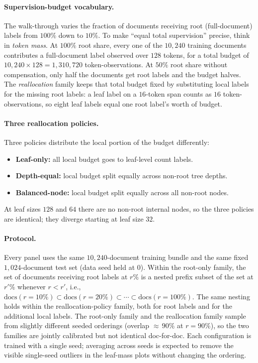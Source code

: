 \paragraph{Supervision-budget vocabulary.}
The walk-through varies the fraction of documents receiving root
(full-document) labels from $100\%$ down to $10\%$. To make
``equal total supervision'' precise, think in \emph{token mass}. At
$100\%$ root share, every one of the $10{,}240$ training documents
contributes a full-document label observed over $128$ tokens, for a
total budget of $10{,}240 \times 128 = 1{,}310{,}720$
token-observations. At $50\%$ root share without compensation, only
half the documents get root labels and the budget halves. The
\emph{reallocation} family keeps that total budget fixed by
substituting local labels for the missing root labels: a leaf label
on a $16$-token span counts as $16$ token-observations, so
eight leaf labels equal one root label's worth of budget.

\paragraph{Three reallocation policies.}
Three policies distribute the local portion of the budget
differently:
\begin{itemize}[leftmargin=1.5em]
    \item \textbf{Leaf-only:} all local budget goes to leaf-level
          count labels.
    \item \textbf{Depth-equal:} local budget split equally across
          non-root tree depths.
    \item \textbf{Balanced-node:} local budget split equally across
          all non-root nodes.
\end{itemize}
At leaf sizes $128$ and $64$ there are no non-root internal nodes,
so the three policies are identical; they diverge starting at leaf
size $32$.

\paragraph{Protocol.}
Every panel uses the same $10{,}240$-document training bundle and the
same fixed $1{,}024$-document test set (data seed held at $0$).
Within the root-only family, the set of documents receiving root
labels at $r\%$ is a nested prefix subset of the set at $r'\%$
whenever $r<r'$, i.e., $\mathrm{docs}(r{=}10\%) \subset
\mathrm{docs}(r{=}20\%) \subset \cdots \subset
\mathrm{docs}(r{=}100\%)$. The same nesting holds within the
reallocation-policy family, both for root labels and for the
additional local labels. The root-only family and the reallocation
family sample from slightly different seeded orderings (overlap
${\approx}\,90\%$ at $r{=}90\%$), so the two families are jointly
calibrated but not identical doc-for-doc. Each configuration is
trained with a single seed; averaging across seeds is expected to
remove the visible single-seed outliers in the leaf-mass plots
without changing the ordering.

